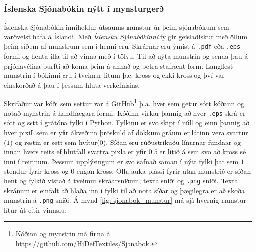 \subsubsection{Íslenska Sjónabókin nýtt í mynsturgerð}
Íslenska Sjónabókin inniheldur útsaums munstur úr þeim sjónabókum sem varðveist hafa á Íslandi. Með \textit{Íslensku Sjónabókinni} fylgir geisladiskur með öllum þeim síðum af munstrum sem í henni eru. Skrárnar eru ýmist á \texttt{.pdf} eða \texttt{.eps} formi og henta illa til að vinna með í tölvu. Til að nýta munstrin og senda þau á prjónavélina þurfti að koma þeim á annað og betra stafrænt form. Langflest munstrin í bókinni eru í tveimur litum þ.e. kross og ekki kross og því var einskorðað á þau í þessum hluta verkefnisins.

Skrifaður var kóði sem settur var á GitHub\footnote{Kóðinn og mynstrin má finna á \url{https://github.com/HiDefTextiles/Sjonabok}.} þ.a. hver sem getur sótt kóðann og notað mynstrin á handhægara formi. Kóðinn virkar þannig að hver \texttt{.eps} skrá er sótt og sett í grátóna fylki í Python. Fylkinu er svo skipt í núll og einn þannig að hver pixill sem er yfir ákveðinn þröskuld af dökkum gráum er látinn vera svartur ($1$) og restin er sett sem hvítur($0$). Síðan eru rúðustrikuðu línurnar fundnar og innan hvers reits ef hlutfall svartra pixla er yfir $0.5$ er litið á sem svo að kross sé inni í reitinum. Þessum upplýsingum er svo safnað saman í nýtt fylki þar sem $1$ stendur fyrir kross og $0$ engan kross. Öllu auka plássi fyrir utan munstrið er síðan hent og fylkið vistað á tveimur skráarsniðum, texta sniði og \texttt{.png} sniði. Texta skránum er einfalt að hlaða inn í fylki til að nota síðar og þægilegra er að skoða munstrin á \texttt{.png} sniði. Á mynd \ref{fig: sjonabok_munstur} má sjá hvernig munstur lítur út eftir vinnslu. 


